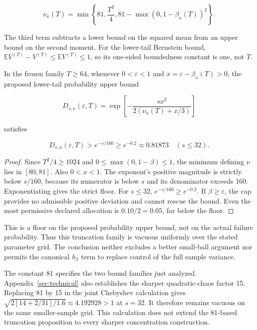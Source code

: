 \begin{equation}
\nu_\kappa(T)=\min\left\{81,\frac{T^2}{4},
81-\max(0,1-\beta_\kappa(T))^2\right\}.
\end{equation}


The third term subtracts a lower bound on the squared mean from an upper bound on the second moment. For the lower-tail Bernstein bound, $\mathbb EV^{(T)}-V^{(T)}\le\mathbb EV^{(T)}\le1$, so its one-sided boundedness constant is one, not $T$.


\begin{proposition}\label{thm:T12}
In the frozen family $T\ge64$, whenever $0<\varepsilon<1$ and $x=\varepsilon-\beta_\kappa(T)>0$, the proposed lower-tail probability upper bound


\begin{equation}
D_{s,\kappa}(\varepsilon,T)
=\exp\!\left[-\frac{sx^2}{2(\nu_\kappa(T)+x/3)}\right]
\end{equation}


satisfies


\begin{equation}
\boxed{D_{s,\kappa}(\varepsilon,T)>e^{-s/160}
\ge e^{-0.2}\approx0.81873\quad(s\le32).}
\end{equation}


\end{proposition}
\begin{proof}
Since $T^2/4\ge1024$ and $0\le\max(0,1-\beta)\le1$, the minimum defining $\nu$ lies in $[80,81]$. Also $0<x<1$. The exponent's positive magnitude is strictly below $s/160$, because its numerator is below $s$ and its denominator exceeds 160. Exponentiating gives the strict floor. For $s\le32$, $e^{-s/160}\ge e^{-0.2}$. If $\beta\ge\varepsilon$, the cap provides no admissible positive deviation and cannot rescue the bound. Even the most permissive declared allocation is $0.10/2=0.05$, far below the floor.

\end{proof}


This is a floor on the proposed probability upper bound, not on the actual failure probability. Thus this truncation family is vacuous uniformly over the stated parameter grid. The conclusion neither excludes a better small-ball argument nor permits the canonical $h_2$ term to replace control of the full sample variance.


The constant 81 specifies the two bound families just analyzed. Appendix~\ref{sec:technical} also establishes the sharper quadratic-chaos factor 15. Replacing 81 by 15 in the joint Chebyshev calculation gives $\sqrt{2[14+2/31]/1.6}\approx4.192928>1$ at $s=32$. It therefore remains vacuous on the same smaller-sample grid. This calculation does not extend the 81-based truncation proposition to every sharper concentration construction.


